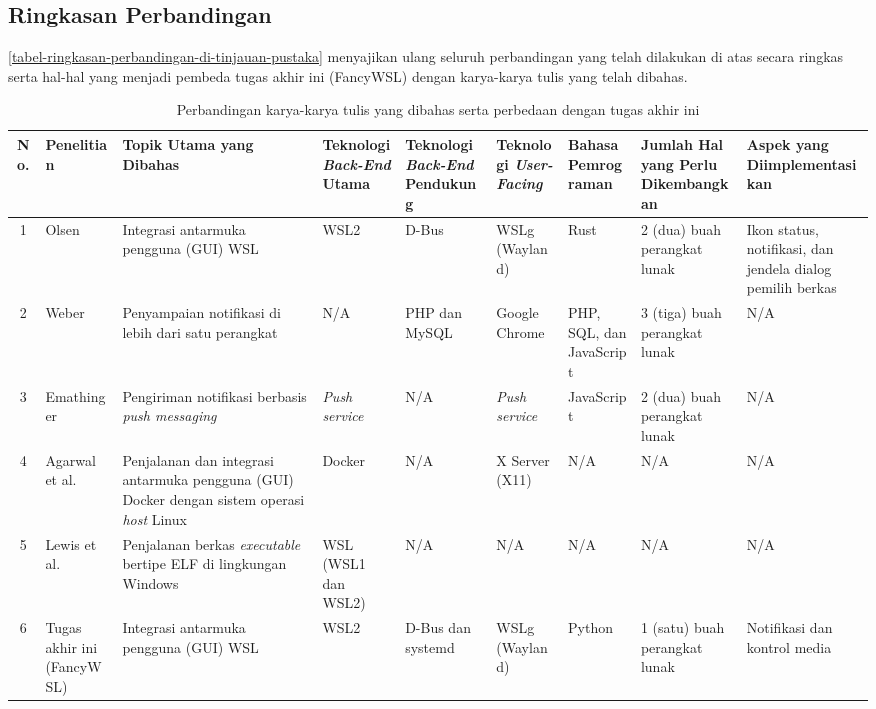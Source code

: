 \subsection{Ringkasan Perbandingan}

\autoref{tabel-ringkasan-perbandingan-di-tinjauan-pustaka} menyajikan ulang seluruh perbandingan yang telah dilakukan di atas secara ringkas serta hal-hal yang menjadi pembeda tugas akhir ini (FancyWSL) dengan karya-karya tulis yang telah dibahas.

\begin{landscape}
\begin{table}
    \centering
    \caption{Perbandingan karya-karya tulis yang dibahas serta perbedaan dengan tugas akhir ini}
    \label{tabel-ringkasan-perbandingan-di-tinjauan-pustaka}
    \begin{tabularx}{\linewidth}{|c|p{3.5cm}|p{3.5cm}|X|X|X|X|X|X|} \hline
        \textbf{No.} & \textbf{Penelitian} & \textbf{Topik Utama yang Dibahas} & \textbf{Teknologi \textit{Back-End} Utama} & \textbf{Teknologi \textit{Back-End} Pendukung} & \textbf{Teknologi \textit{User-Facing}} & \textbf{Bahasa Pemrograman} & \textbf{Jumlah Hal yang Perlu Dikembangkan} & \textbf{Aspek yang Diimplementasikan}\\ \hline
        1 & Olsen \cite{olsen-2022-through-the-wormhole} & Integrasi antarmuka pengguna (GUI) WSL & WSL2 & D-Bus & WSLg (Wayland) & Rust & 2 (dua) buah perangkat lunak & Ikon status, notifikasi, dan jendela dialog pemilih berkas \\ \hline
        
        2 & Weber \cite{weber2015notifications} & Penyampaian notifikasi di lebih dari satu perangkat & N/A & PHP dan MySQL & Google Chrome & PHP, SQL, dan JavaScript & 3 (tiga) buah perangkat lunak & N/A\\ \hline
        
        3 & Emathinger \cite{emathinger2015unified} & Pengiriman notifikasi berbasis \textit{push messaging} & \textit{Push service} & N/A & \textit{Push service} & JavaScript & 2 (dua) buah perangkat lunak & N/A\\ \hline
        
        4 & Agarwal et al. \cite{agarwal2021gui} & Penjalanan dan integrasi antarmuka pengguna (GUI) Docker dengan sistem operasi \textit{host} Linux & Docker & N/A & X Server (X11) & N/A & N/A & N/A\\ \hline
        
        5 & Lewis et al. \cite{lewis2018memory} & Penjalanan berkas \textit{executable} bertipe ELF di lingkungan Windows & WSL (WSL1 dan WSL2) & N/A & N/A & N/A & N/A & N/A\\ \hline
        
        6 & Tugas akhir ini (FancyWSL) & Integrasi antarmuka pengguna (GUI) WSL & WSL2 & D-Bus dan systemd & WSLg (Wayland) & Python & 1 (satu) buah perangkat lunak & Notifikasi dan kontrol media\\ \hline
    \end{tabularx}
\end{table}
\end{landscape}


